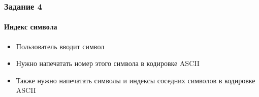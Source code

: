 \documentclass[14pt,pdf,hyperref={unicode}]{beamer}
\begin{document}
\begin{frame}
\frametitle{Задание 4} 
\framesubtitle{Индекс символа} 
\begin{center}
\begin{itemize}
\item Пользователь вводит символ\\
\item Нужно напечатать номер этого символа в кодировке ASCII\\
\item Также нужно напечатать символы и индексы соседних символов в кодировке ASCII \\
\end{itemize}
\end{center}
\end{frame}
\end{document}
